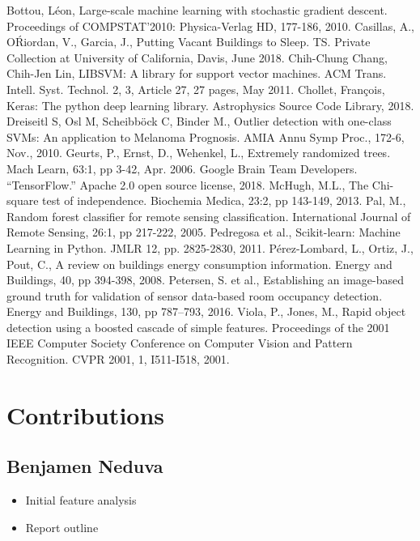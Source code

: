 \documentclass[letterpaper, 12 pt, conference]{ieeeconf}  %
\begin{document}
\begin{thebibliography}{99}

 Bottou, L{\' e}on, Large-scale machine learning with stochastic gradient descent. Proceedings of COMPSTAT'2010: Physica-Verlag HD, 177-186, 2010.
 Casillas, A., O{\' R}iordan, V., Garcia, J., Putting Vacant Buildings to Sleep. TS. Private Collection at University of California, Davis, June 2018.
 Chih-Chung Chang, Chih-Jen Lin, LIBSVM: A library for support vector machines. ACM Trans. Intell. Syst. Technol. 2, 3, Article 27, 27 pages, May 2011.
 Chollet, Fran{\c c}ois, Keras: The python deep learning library. Astrophysics Source Code Library, 2018.
 Dreiseitl S, Osl M, Scheibb{\"o}ck C, Binder M., Outlier detection with one-class SVMs: An application to Melanoma Prognosis. AMIA Annu Symp Proc., 172-6, Nov., 2010.
 Geurts, P., Ernst, D., Wehenkel, L., Extremely randomized trees. Mach Learn, 63:1, pp 3-42, Apr. 2006.
 Google Brain Team Developers. “TensorFlow.” Apache 2.0 open source license, 2018.
 McHugh, M.L., The Chi-square test of independence. Biochemia Medica, 23:2, pp 143-149, 2013.
 Pal, M., Random forest classifier for remote sensing classification. International Journal of Remote Sensing, 26:1, pp 217-222, 2005.
 Pedregosa et al., Scikit-learn: Machine Learning in Python. JMLR 12, pp. 2825-2830, 2011.
 Pérez-Lombard, L., Ortiz, J., Pout, C., A review on buildings energy consumption information. Energy and Buildings, 40, pp 394-398, 2008.
 Petersen, S. et al., Establishing an image-based ground truth for validation of sensor data-based room occupancy detection. Energy and Buildings, 130, pp 787–793, 2016.
 Viola, P., Jones, M., Rapid object detection using a boosted cascade of simple features. Proceedings of the 2001 IEEE Computer Society Conference on Computer Vision and Pattern Recognition. CVPR 2001, 1, I511-I518, 2001. 

\end{thebibliography}

\section{Contributions}

\subsection*{Benjamen Neduva}
        \begin{itemize}
                \item Initial feature analysis
                \item Report outline
        \end{itemize}
\end{document}
